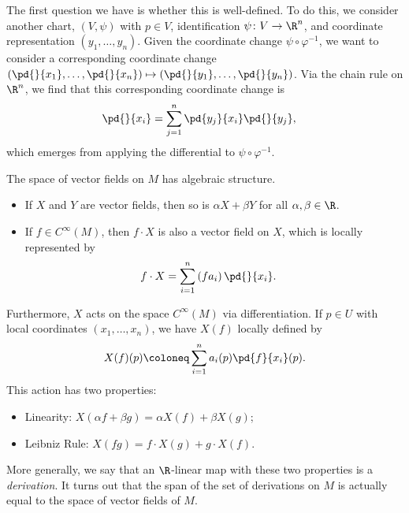 \documentclass[10pt]{mypackage}
\begin{document}
The first question we have is whether this is well-defined. To do this, we consider another chart, $\left( V,\psi \right)$ with $p\in V$, identification $\psi\colon V\rightarrow \R^{n}$, and coordinate representation $\left( y_1,\dots,y_n \right)$. Given the coordinate change $\psi\circ \varphi^{-1}$, we want to consider a corresponding coordinate change $ \left( \pd{}{x_1},\dots, \pd{}{x_n} \right) \mapsto \left( \pd{}{y_1},\dots, \pd{}{y_n} \right) $. Via the chain rule on $\R^{n}$, we find that this corresponding coordinate change is
\begin{align*}
  \pd{}{x_i} &= \sum_{j=1}^{n} \pd{y_j}{x_i}\pd{}{y_j},
\end{align*}
which emerges from applying the differential to $\psi\circ \varphi^{-1}$.\newline

The space of vector fields on $M$ has algebraic structure.
\begin{itemize}
  \item If $X$ and $Y$ are vector fields, then so is $\alpha X + \beta Y$ for all $\alpha,\beta\in \R$.
  \item If $f\in C^{\infty}\left( M \right)$, then $f\cdot X$ is also a vector field on $X$, which is locally represented by
    \begin{align*}
      f\cdot X &= \sum_{i=1}^{n} \left( fa_i \right) \pd{}{x_i}.
    \end{align*}
\end{itemize}
Furthermore, $X$ acts on the space $C^{\infty}\left( M \right)$ via differentiation. If $p\in U$ with local coordinates $\left( x_1,\dots,x_n \right)$, we have $X(f)$ locally defined by
\begin{align*}
  X(f)(p) \coloneq \sum_{i=1}^{n} a_i(p) \pd{f}{x_i}(p).
\end{align*}
This action has two properties:
\begin{itemize}
  \item Linearity: $X\left( \alpha f + \beta g \right) = \alpha X(f) + \beta X(g)$;
  \item Leibniz Rule: $X\left( fg \right) = f\cdot X(g) + g\cdot X(f)$.
\end{itemize}
More generally, we say that an $\R$-linear map with these two properties is a \textit{derivation}. It turns out that the span of the set of derivations on $M$ is actually equal to the space of vector fields of $M$.\newline
\end{document}
